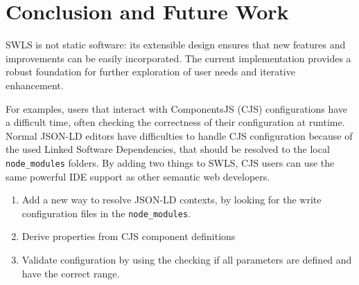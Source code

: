 \section{Conclusion and Future Work}%
\label{sec:conclusion}

SWLS is not static software: its extensible design ensures that new features and improvements can be easily incorporated. 
The current implementation provides a robust foundation for further exploration of user needs and iterative enhancement.

For examples,
users that interact with ComponentsJS (CJS) configurations have a difficult time\cite{CJS}, often checking the correctness of their configuration at runtime.
Normal JSON-LD editors have difficulties to handle CJS configuration because of the used Linked Software Dependencies\cite{CJS2}, that should be resolved to the local \texttt{node\_modules} folders.
By adding two things to SWLS, CJS users can use the same powerful IDE support as other semantic web developers.
\begin{enumerate}
  \item Add a new way to resolve JSON-LD contexts, by looking for the write configuration files in the \texttt{node\_modules}.
  \item Derive properties from CJS component definitions
  \item Validate configuration by using the checking if all parameters are defined and have the correct range.

\end{enumerate}
